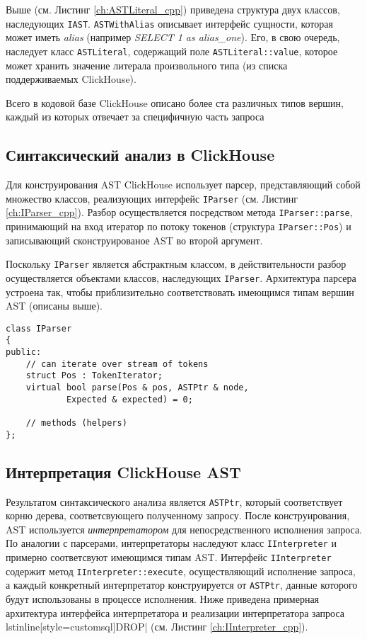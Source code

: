 Выше (см. Листинг \ref{ch:ASTLiteral_cpp}) приведена структура двух классов, наследующих \lstinline[style=customcpp]|IAST|. \lstinline[style=customcpp]|ASTWithAlias| описывает интерфейс сущности, которая может иметь \textit{alias} (например \textit{SELECT 1 as alias\_one}). Его, в свою очередь, наследует класс \lstinline[style=customcpp]|ASTLiteral|, содержащий поле \lstinline[style=customcpp]|ASTLiteral::value|, которое может хранить значение литерала произвольного типа (из списка поддерживаемых ClickHouse).

Всего в кодовой базе ClickHouse описано более ста различных типов вершин, каждый из которых отвечает за специфичную часть запроса

\subsection{Синтаксический анализ в ClickHouse}
Для конструирования AST ClickHouse использует парсер, представляющий собой множество классов, реализующих интерфейс \lstinline[style=customcpp]|IParser| (см. Листинг \ref{ch:IParser_cpp}). Разбор осуществляется посредством метода \lstinline[style=customcpp]|IParser::parse|, принимающий на вход итератор по потоку токенов (структура \lstinline[style=customcpp]|IParser::Pos|) и записывающий сконструированое AST во второй аргумент.

Поскольку \lstinline[style=customcpp]|IParser| является абстрактным классом, в действительности разбор осуществляется объектами классов, наследующих \lstinline[style=customcpp]|IParser|. Архитектура парсера устроена так, чтобы приблизительно соответствовать имеющимся типам вершин AST (описаны выше).

\begin{lstlisting}[style=customcpp, label={ch:IParser_cpp}, caption={Интерфейс парсера}, captionpos=b]
class IParser
{
public:
    // can iterate over stream of tokens
    struct Pos : TokenIterator;
    virtual bool parse(Pos & pos, ASTPtr & node,
            Expected & expected) = 0;

    // methods (helpers)
};
\end{lstlisting}

\subsection{Интерпретация ClickHouse AST}
Результатом синтаксического анализа является \lstinline[style=customcpp]|ASTPtr|, который соответствует корню дерева, соответсвующего полученному запросу. После конструирования, AST используется \textit{интерпретатором} для непосредственного исполнения запроса. По аналогии с парсерами, интерпретаторы наследуют класс \lstinline[style=customcpp]|IInterpreter| и примерно соответсвуют имеющимся типам AST. Интерфейс \lstinline[style=customcpp]|IInterpreter| содержит метод \lstinline[style=customcpp]|IInterpreter::execute|, осуществляющий исполнение запроса, а каждый конкретный интерпретатор конструируется от \lstinline[style=customcpp]|ASTPtr|, данные которого будут использованы в процессе исполнения. Ниже приведена примерная архитектура интерфейса интерпретатора и реализации интерпретатора запроса lstinline[style=customsql]DROP| (см. Листинг \ref{ch:IInterpreter_cpp}).

